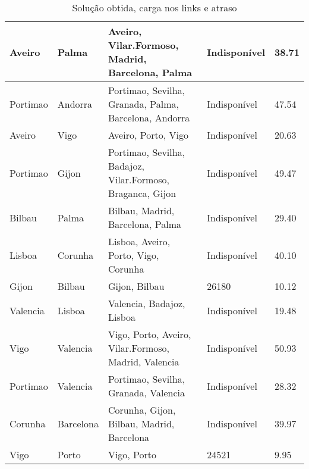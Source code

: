 \begin{table}[!htb]
{\begin{tabular}{|l|l|l|l|l|}
Aveiro & Palma & Aveiro, Vilar.Formoso, Madrid, Barcelona, Palma & Indisponível & 38.71 \\ \hline
Portimao & Andorra & Portimao, Sevilha, Granada, Palma, Barcelona, Andorra & Indisponível & 47.54 \\ \hline
Aveiro & Vigo & Aveiro, Porto, Vigo & Indisponível & 20.63 \\ \hline
Portimao & Gijon & Portimao, Sevilha, Badajoz, Vilar.Formoso, Braganca, Gijon & Indisponível & 49.47 \\ \hline
Bilbau & Palma & Bilbau, Madrid, Barcelona, Palma & Indisponível & 29.40 \\ \hline
Lisboa & Corunha & Lisboa, Aveiro, Porto, Vigo, Corunha & Indisponível & 40.10 \\ \hline
Gijon & Bilbau & Gijon, Bilbau & 26180 & 10.12 \\ \hline
Valencia & Lisboa & Valencia, Badajoz, Lisboa & Indisponível & 19.48 \\ \hline
Vigo & Valencia & Vigo, Porto, Aveiro, Vilar.Formoso, Madrid, Valencia & Indisponível & 50.93 \\ \hline
Portimao & Valencia & Portimao, Sevilha, Granada, Valencia & Indisponível & 28.32 \\ \hline
Corunha & Barcelona & Corunha, Gijon, Bilbau, Madrid, Barcelona & Indisponível & 39.97 \\ \hline
Vigo & Porto & Vigo, Porto & 24521 & 9.95 \\ \hline
\end{tabular}}
\caption[]{Solução obtida, carga nos links e atraso}
\end{table}

